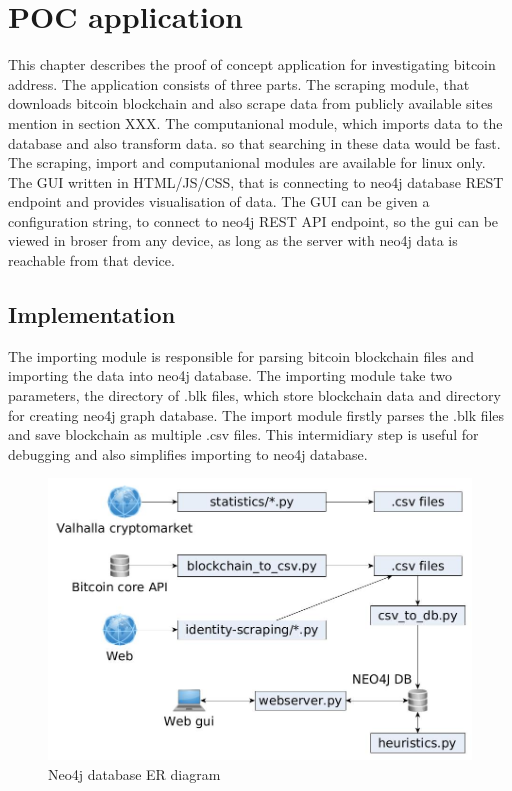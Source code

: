 \documentclass[
  digital, %
  table,   %
  lof,     %
  lot,     %
  oneside
]{fithesis3}
\begin{document}
\chapter{POC application}

This chapter describes the proof of concept application for investigating bitcoin address.
The application consists of three parts.
The scraping module, that downloads bitcoin blockchain and also scrape data from publicly available sites mention in section XXX.
The computanional module, which imports data to the database and also transform data. so that searching in these data would be fast.
The scraping, import and computanional modules are available for linux only.
The GUI written in HTML/JS/CSS, that is connecting to neo4j database REST endpoint and provides visualisation of data.
The GUI can be given a configuration string, to connect to neo4j REST API endpoint, so the gui can be viewed in broser from any device, as long as 
the server with neo4j data is reachable from that device.


\section{Implementation}

The importing module is responsible for parsing bitcoin blockchain files and importing the data into neo4j database.
The importing module take two parameters, the directory of .blk files, which store blockchain data and directory for creating neo4j graph database.
The import module firstly parses the .blk files and save blockchain as multiple .csv files. This intermidiary step is useful for debugging and also simplifies importing to neo4j database.

\begin{figure}[h]
    \centering
    \includegraphics[width=1\textwidth]{application_architecture}
    \caption{Neo4j database ER diagram}
    \label{application_architecture}
\end{figure}
\end{document}
